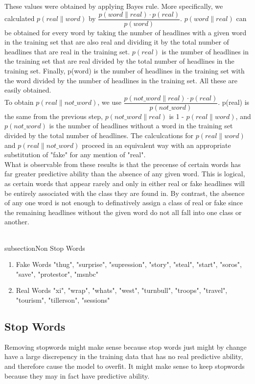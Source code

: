 \documentclass{article}
\begin{document}
   These values were obtained by applying Bayes rule. More specifically, we calculated $p(real \| word)$ by
   $ \dfrac {p(word \| real) \cdot p(real)}{p(word)}$. $p(word \| real)$ can be obtained for every word by taking
   the number of headlines with a given word in the training set that are also real and dividing it by the
   total number of headlines that are real in the training set. $p(real)$ is the number of headlines in the
   training set that are real divided by the total number of headlines in the training set. Finally, p(word) is
   the number of headlines in the training set with the word divided by the number of headlines in the training set.
   All these are easily obtained.
   \\
   To obtain $p(real \| not\_word)$, we use $ \dfrac {p(not\_word \| real) \cdot p(real)}{p(not\_word)}$. p(real)
   is the same from the previous step, $p(not\_word \| real)$ is 1 - $p(real \| word)$, and $p(not\_word)$ is the
   number of headlines without a word in the training  set divided by the total number of headlines.
   The calculcations for $p(real \| word)$ and $p(real \| not\_word)$ proceed in an equivalent way with an
   appropriate substitution of "fake" for any mention of "real".
   \\
  


   What is observable from these results is that the precense of certain words has far greater predictive ability
   than the absence of any given word. This is logical, as certain words that appear rarely and only in either
   real or fake headlines will be entirely associated with the class they are found in. By contrast, the
   absence of any one word is not enough to definatively assign a class of real or fake since the remaining
   headlines without the given word do not all fall into one class or another.

   \\subsection{Non Stop Words}
   \begin{enumerate}
\item Fake Words
"thug", "surprise", "supression", "story", "steal", "start", "soros", "save", "protestor", "msnbc"
\item Real Words
	"xi", "wrap", "whats", "west", "turnbull", "troops", "travel", "tourism", "tillerson", "sessions"

   \end{enumerate}

   \subsection{Stop Words}
   Removing stopwords might make sense because stop words just might by change have a large discrepency in the
   training data that has no real predictive ability, and therefore cause the model to overfit. It might make
   sense to keep stopwords because they may in fact have predictive ability.
\end{document}

